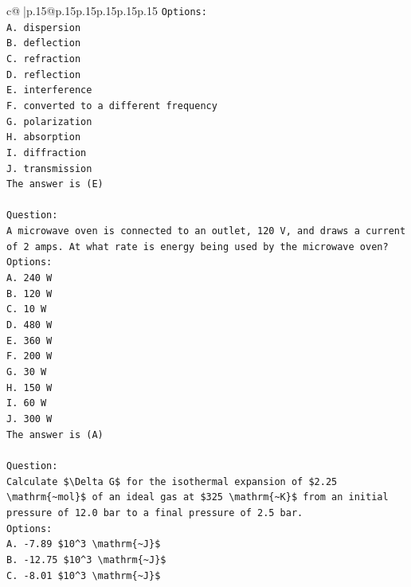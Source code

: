 \documentclass{article}
\begin{document}
{\begin{supertabular}{c@{$\;$}|p{.15\linewidth}@{}p{.15\linewidth}p{.15\linewidth}p{.15\linewidth}p{.15\linewidth}p{.15\linewidth}}
{{{\texttt{Options:} \\
\texttt{A. dispersion} \\
\texttt{B. deflection} \\
\texttt{C. refraction} \\
\texttt{D. reflection} \\
\texttt{E. interference} \\
\texttt{F. converted to a different frequency} \\
\texttt{G. polarization} \\
\texttt{H. absorption} \\
\texttt{I. diffraction} \\
\texttt{J. transmission} \\
\texttt{The answer is (E)} \\
\\ 
\texttt{Question:} \\
\texttt{A microwave oven is connected to an outlet, 120 V, and draws a current of 2 amps. At what rate is energy being used by the microwave oven?} \\
\texttt{Options:} \\
\texttt{A. 240 W} \\
\texttt{B. 120 W} \\
\texttt{C. 10 W} \\
\texttt{D. 480 W} \\
\texttt{E. 360 W} \\
\texttt{F. 200 W} \\
\texttt{G. 30 W} \\
\texttt{H. 150 W} \\
\texttt{I. 60 W} \\
\texttt{J. 300 W} \\
\texttt{The answer is (A)} \\
\\ 
\texttt{Question:} \\
\texttt{Calculate \$\textbackslash{}Delta G\$ for the isothermal expansion of \$2.25 \textbackslash{}mathrm\{\textasciitilde{}mol\}\$ of an ideal gas at \$325 \textbackslash{}mathrm\{\textasciitilde{}K\}\$ from an initial pressure of 12.0 bar to a final pressure of 2.5 bar.} \\
\texttt{Options:} \\
\texttt{A. {-}7.89 \$10\^{}3 \textbackslash{}mathrm\{\textasciitilde{}J\}\$} \\
\texttt{B. {-}12.75 \$10\^{}3 \textbackslash{}mathrm\{\textasciitilde{}J\}\$} \\
\texttt{C. {-}8.01 \$10\^{}3 \textbackslash{}mathrm\{\textasciitilde{}J\}\$} \\
}}}
\end{supertabular}}
\end{document}
